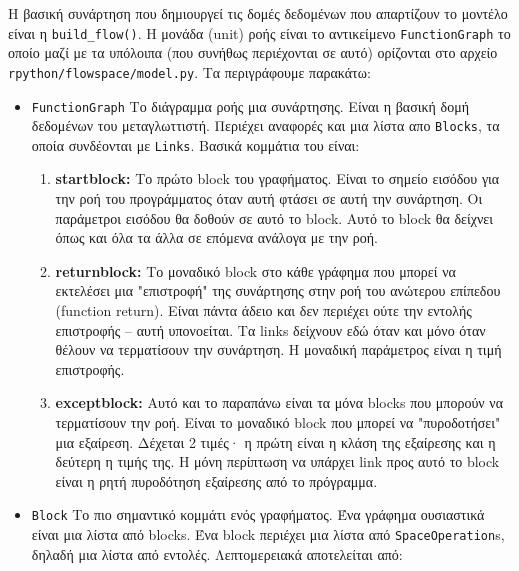Η βασική συνάρτηση που δημιουργεί τις δομές δεδομένων που απαρτίζουν το μοντέλο
είναι η \texttt{build\_flow()}. Η μονάδα (unit) ροής είναι το αντικείμενο
\texttt{FunctionGraph} το οποίο μαζί με τα υπόλοιπα (που συνήθως περιέχονται σε
αυτό) ορίζονται στο αρχείο \texttt{rpython/flowspace/model.py}. Τα περιγράφουμε
παρακάτω:

\begin{itemize}

\item \texttt{FunctionGraph} Το διάγραμμα ροής μια συνάρτησης. Είναι η βασική
δομή δεδομένων του μεταγλωττιστή. Περιέχει αναφορές και μια λίστα απο
\texttt{Blocks}, τα οποία συνδέονται με \texttt{Links}. Βασικά κομμάτια του
είναι:

\begin{enumerate}
\item \textbf{startblock:} Το πρώτο block του γραφήματος. Είναι το σημείο
εισόδου για την ροή του προγράμματος όταν αυτή φτάσει σε αυτή την συνάρτηση. Οι
παράμετροι εισόδου θα δοθούν σε αυτό το block. Αυτό το block θα δείχνει όπως
και όλα τα άλλα σε επόμενα ανάλογα με την ροή.
\item \textbf{returnblock:} Το μοναδικό block στο κάθε γράφημα που μπορεί να
εκτελέσει μια "επιστροφή" της συνάρτησης στην ροή του ανώτερου επίπεδου
(function return). Είναι πάντα άδειο και δεν περιέχει ούτε την εντολής
επιστροφής – αυτή υπονοείται. Τα links δείχνουν εδώ όταν και μόνο όταν θέλουν
να τερματίσουν την συνάρτηση. Η μοναδική παράμετρος είναι η τιμή επιστροφής.
\item \textbf{exceptblock:} Αυτό και το παραπάνω είναι τα μόνα blocks που
μπορούν να τερματίσουν την ροή. Είναι το μοναδικό block που μπορεί να
"πυροδοτήσει" μια εξαίρεση. Δέχεται 2 τιμές· η πρώτη είναι η κλάση της εξαίρεσης
και η δεύτερη η τιμής της. Η μόνη περίπτωση να υπάρχει link προς αυτό το block
είναι η ρητή πυροδότηση εξαίρεσης από το πρόγραμμα.
\end{enumerate}

\item \texttt{Block} Το πιο σημαντικό κομμάτι ενός γραφήματος. Ένα γράφημα
ουσιαστικά είναι μια λίστα από blocks. Ένα block περιέχει μια λίστα από
\texttt{SpaceOperation}s, δηλαδή μια λίστα από εντολές. Λεπτομερειακά
αποτελείται από:


\end{itemize}

